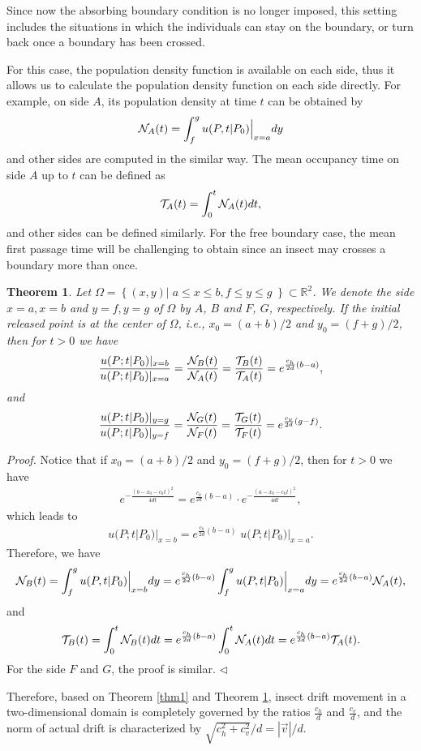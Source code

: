 \documentclass[11pt]{article}
\newtheorem{theorem}{Theorem}[section]
\newenvironment{proof}{{\it Proof. }}{$\triangleleft$}
\newcommand{\bean}{\begin{eqnarray*}}
\newcommand{\eean}{\end{eqnarray*}}
\newcommand{\Real}{\mathbb R}
\begin{document}
Since now the absorbing boundary condition is no longer imposed, this setting includes the situations in which  
the individuals can stay on the boundary, or turn back once a boundary has been crossed.

For this case, the population density function is available on each side, thus it allows us to calculate the
population density function on each side directly. For example, on side $A$, its population density at time $t$ can be obtained by
\bean
{\cal N}_A(t)=\int_f^g u(P, t|P_0)\Big|_{x=a} dy 
\eean 
and other sides are computed in the similar way. The mean occupancy time on side $A$ up to $t$ can be defined as
\[{\cal T}_A(t)=\int_0^t{\cal N}_A(t)dt,\]
 and other sides can be defined similarly. For the free boundary case,  the mean first passage time will be challenging to obtain since an insect may crosses a boundary more than once. 
\begin{theorem}\label{thm2} Let $\Omega=\left\{(x, y)|\; a\leq x\leq b, f\leq y\leq g\;\right\}\subset \Real^2$. We denote the side $x=a, x=b$ and $y=f, y=g$ of $\Omega$ by $A$, $B$ and $F$, $G$, respectively. If the initial released point is at the center of $\Omega$, i.e., $x_0=(a+b)/2$ and $y_0=(f+g)/2$, then for $t>0$ we have
\bean
\frac{u(P; t|P_0)|_{x=b}}{u(P; t|P_0)|_{x=a}}=\frac{{\cal N}_B(t)}{{\cal N}_A(t)}=\frac{{\cal T}_B(t)}{{\cal T}_A(t)}=e^{\frac{c_h}{2d}(b-a)},
\eean
and
\bean
\frac{u(P; t|P_0)|_{y=g}}{u(P; t|P_0)|_{y=f}}=\frac{{\cal N}_G(t)}{{\cal N}_F(t)}=\frac{{\cal T}_G(t)}{{\cal T}_F(t)}=e^{\frac{c_v}{2d}(g-f)}.
\eean
\end{theorem}
\begin{proof} Notice that if $x_0=(a+b)/2$ and $y_0=(f+g)/2$, then for $t>0$ we have
\bean
e^{-\frac{(b-x_0-c_ht)^2}{4dt}}= e^{\frac{c_h}{2d}(b-a)}\cdot e^{-\frac{(a-x_0-c_ht)^2}{4dt}},
\eean
which leads to
\bean
u(P; t|P_0)|_{x=b}=e^{\frac{c_h}{2d}(b-a)}\;u(P; t|P_0)|_{x=a}.
\eean
Therefore, we have
\bean
{\cal N}_B(t)=\int_f^g u(P, t|P_0)\Big|_{x=b} dy =e^{\frac{c_h}{2d}(b-a)}\int_f^g u(P, t|P_0)\Big|_{x=a} dy=e^{\frac{c_h}{2d}(b-a)}{\cal N}_A(t),
\eean
and
\bean
{\cal T}_B(t)=\int_0^t{\cal N}_B(t)dt=e^{\frac{c_h}{2d}(b-a)}\int_0^t{\cal N}_A(t)dt=e^{\frac{c_h}{2d}(b-a)}{\cal T}_A(t).
\eean
For the side $F$ and $G$, the proof is similar.
\end{proof}

Therefore, based on Theorem \ref{thm1} and Theorem \ref{thm2}, insect drift movement in a two-dimensional domain is completely governed by the ratios $\frac{c_h}{d}$ and $\frac{c_v}{d}$, and the norm of actual drift is characterized by $\sqrt{c_h^2+c_v^2}/d=|\vec{v}|/d$.
\end{document}
